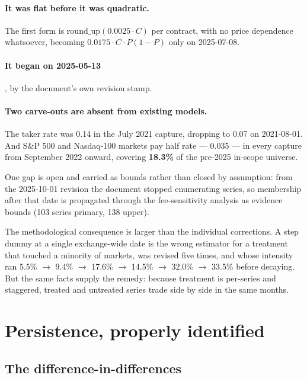 \documentclass[preprint,12pt,authoryear]{elsarticle}
\begin{document}
\paragraph{It was flat before it was quadratic.} The first form is
$\mathrm{round\_up}(0.0025 \cdot C)$ per contract, with no price dependence
whatsoever, becoming $0.0175 \cdot C \cdot P(1-P)$ only on 2025-07-08.

\paragraph{It began on 2025-05-13}, by the document's own revision stamp.

\paragraph{Two carve-outs are absent from existing models.} The taker rate was
0.14 in the July 2021 capture, dropping to 0.07 on 2021-08-01. And S\&P 500 and
Nasdaq-100 markets pay half rate --- 0.035 --- in every capture from September
2022 onward, covering \textbf{18.3\%} of the pre-2025 in-scope universe.

One gap is open and carried as bounds rather than closed by assumption: from the
2025-10-01 revision the document stopped enumerating series, so membership after
that date is propagated through the fee-sensitivity analysis as evidence bounds
(103 series primary, 138 upper).

The methodological consequence is larger than the individual corrections. A step
dummy at a single exchange-wide date is the wrong estimator for a treatment that
touched a minority of markets, was revised five times, and whose intensity ran
5.5\% $\rightarrow$ 9.4\% $\rightarrow$ 17.6\% $\rightarrow$ 14.5\%
$\rightarrow$ 32.0\% $\rightarrow$ 33.5\% before decaying. But the same facts
supply the remedy: because treatment is per-series and staggered, treated and
untreated series trade side by side in the same months.

\section{Persistence, properly identified}\label{sec:persistence}

\subsection{The difference-in-differences}
\end{document}

